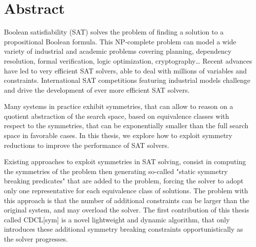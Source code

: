 \chapter*{Abstract}

%


Boolean satisfiability (SAT) solves the problem of finding a solution to a propositional Boolean formula.
This NP-complete problem can model a wide variety of industrial and academic problems
covering planning, dependency resolution, formal verification, logic optimization, cryptography\ldots
Recent advances have led to very efficient SAT solvers, able to deal with millions of variables and 
constraints. International SAT competitions featuring industrial models challenge and drive the
 development of ever more efficient SAT solvers.
 
Many systems in practice exhibit symmetries, that can allow to reason on a quotient abstraction of the 
search space, based on equivalence classes with respect to the symmetries, that can be exponentially smaller than the full search space in favorable cases.
In this thesis, we explore how to exploit symmetry reductions to improve the performance of SAT solvers.

Existing approaches to exploit symmetries in SAT solving, consist in computing the symmetries of the problem 
then generating so-called "static symmetry breaking predicates" that are added to the problem, forcing the solver to 
adopt only one representative for each equivalence class of solutions.
The problem with this approach is that the number of additional constraints can be larger than the original system,
 and may overload the solver. The first contribution of this thesis called CDCL[sym] is a novel lightweight and dynamic algorithm,  that only introduces these additional symmetry breaking constraints opportunistically as the solver progresses.
 
